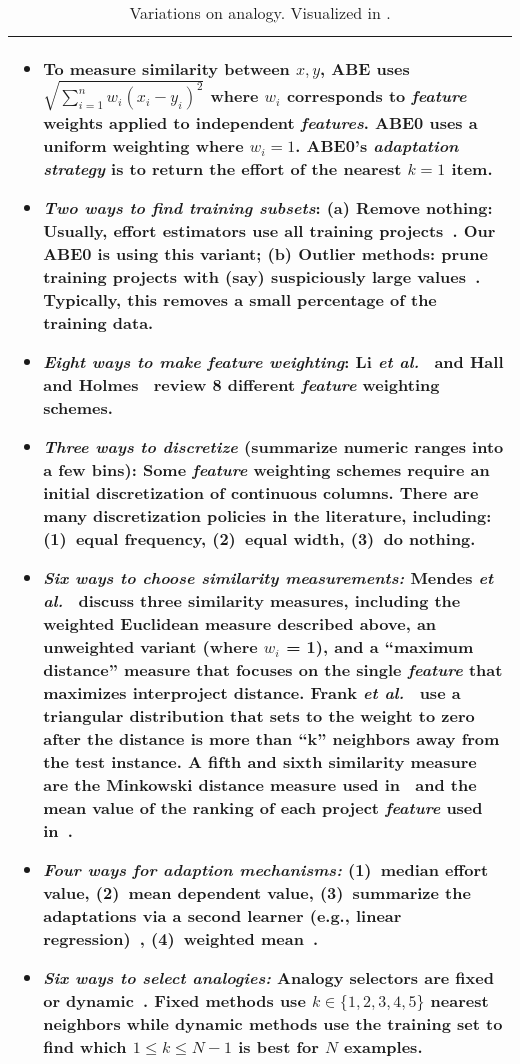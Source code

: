 \begin{table}[!t]
\caption{Variations on analogy. 
 Visualized in
.}\label{tbl:aben}

\begin{tabular}{|p{.94\linewidth}|}\hline

\begin{itemize}
\item
To measure    similarity between  $x,y$, 
ABE uses $\sqrt{\sum_{i=1}^n w_i(x_i-y_i)^2}$ where  $w_i$ corresponds to {\em feature} weights applied to independent {\em features}. ABE0 uses a uniform weighting where $w_i=1$.
ABE0's {\em adaptation strategy} is to return the  effort   of the nearest $k=1$   item.
\item
{\em Two ways to find training subsets}:
(a) Remove nothing: Usually, effort estimators use all training projects~\cite{chang1974finding}. Our ABE0 is using this variant;
(b) Outlier methods: prune training projects with (say) suspiciously large  values~\cite{keung2008analogy}. Typically, this removes a small percentage of the training data.
\item
{\em Eight ways to make feature weighting}:
Li {\it et al.}~\cite{li2009study} and Hall and Holmes~\cite{hall2003benchmarking} review 8 different {\em feature} weighting schemes.
\item
{\em Three ways to discretize} (summarize numeric ranges into a few bins):
Some {\em feature} weighting schemes require an initial discretization of continuous  columns. There are many discretization policies in the literature, including:
(1)~equal frequency,
(2)~equal width, 
(3)~do nothing.
\item
{\em Six ways to choose similarity measurements:}
Mendes {\it et al.}~\cite{mendes2003comparative} discuss three similarity measures, including the weighted Euclidean measure described above, an unweighted variant (where $w_i$ = 1), and a ``maximum distance'' measure that focuses on the single {\em feature} that maximizes interproject distance. Frank {\it et al.}~\cite{frank2002locally} use a triangular distribution that sets to the weight to zero after the distance is more than ``k'' neighbors away from the test instance. A fifth and sixth similarity measure are the Minkowski distance measure used in~\cite{angelis2000simulation} and the mean value of the ranking of each project {\em feature} used in~\cite{walkerden1999empirical}.
\item
{\em Four ways for adaption mechanisms:} 
(1)~median effort value,
(2)~mean dependent value,
(3)~summarize the adaptations via a second learner (e.g., linear regression)~\cite{li2009study,menzies2006selecting,baker2007hybrid,quinlan1992learning},
(4)~weighted mean~\cite{mendes2003comparative}.
\item
{\em Six ways to select analogies:}
Analogy selectors  are  fixed or dynamic~\cite{teak2012}. Fixed methods use $k\in\{1,2,3,4,5\}$
nearest neighbors
while  dynamic methods use the training set to find which $1 \le k \le N-1$ is best for   $N$ examples.
\end{itemize}
\\\hline
\end{tabular}
\end{table}